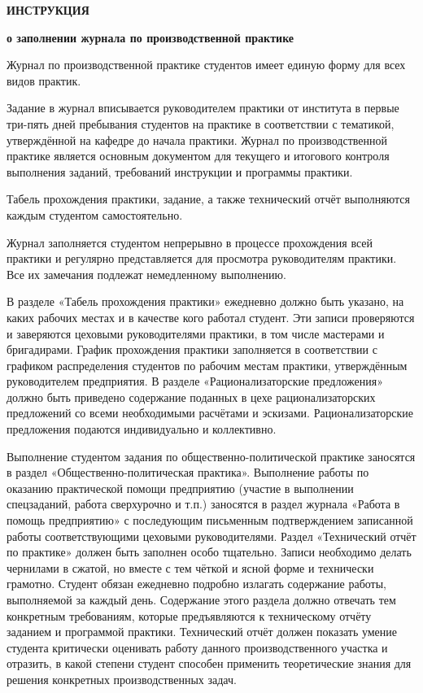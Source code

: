 \begin{center}
\bfseries{\large ИНСТРУКЦИЯ }

\vspace{12pt}

\bfseries{о заполнении журнала по производственной практике}
\end{center}

\begin{multicols}{2}
{\small
Журнал по производственной практике студентов имеет единую форму для всех видов практик.

Задание в журнал вписывается руководителем практики от института в первые три-пять дней пребывания студентов на практике в соответствии с тематикой, утверждённой на кафедре до начала практики. Журнал по производственной практике является основным документом для текущего и итогового контроля выполнения заданий, требований инструкции и программы практики.

Табель прохождения практики, задание, а также технический отчёт выполняются каждым студентом самостоятельно.

Журнал заполняется студентом непрерывно в процессе прохождения всей практики и регулярно представляется для просмотра руководителям практики. Все их замечания подлежат немедленному выполнению.

В разделе «Табель прохождения практики» ежедневно должно быть указано, на каких рабочих местах и в качестве кого работал студент. Эти записи проверяются и заверяются цеховыми руководителями практики, в том числе мастерами и бригадирами. График прохождения практики заполняется в соответствии с графиком распределения студентов по рабочим местам практики, утверждённым руководителем предприятия.
В разделе «Рационализаторские предложения» должно быть приведено содержание поданных в цехе рационализаторских предложений со всеми необходимыми расчётами и эскизами. Рационализаторские предложения подаются индивидуально и коллективно.

Выполнение студентом задания по общественно-политической практике заносятся в раздел «Общественно-политическая практика». Выполнение работы по оказанию практической помощи предприятию (участие в выполнении спецзаданий, работа сверхурочно и т.п.) заносятся в раздел журнала «Работа в помощь предприятию» с последующим письменным подтверждением записанной работы соответствующими цеховыми руководителями.
Раздел «Технический отчёт по практике» должен быть заполнен особо тщательно. Записи необходимо делать чернилами в сжатой, но вместе с тем чёткой и ясной форме и технически грамотно. Студент обязан ежедневно подробно излагать содержание работы, выполняемой за каждый день. Содержание этого раздела должно отвечать тем конкретным требованиям, которые предъявляются к техническому отчёту заданием и программой практики. Технический отчёт должен показать умение студента критически оценивать работу данного производственного участка и отразить, в какой степени студент способен применить теоретические знания для решения конкретных производственных задач.

}
\end{multicols}
